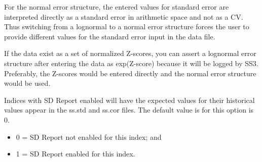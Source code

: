 For the normal error structure, the entered values for standard error are interpreted directly as a standard error in arithmetic space and not as a CV.  Thus switching from a lognormal to a normal error structure forces the user to provide different values for the standard error input in the data file.

If the data exist as a set of normalized Z-scores, you can assert a lognormal error structure after entering the data as exp(Z-score) because it will be logged by SS3.  Preferably, the Z-scores would be entered directly and the normal error structure would be used.

Indices with SD Report enabled will have the expected values for their historical values appear in the ss.std and ss.cor files. The default value is for this option is 0.
	\begin{itemize}
		\item 0 = SD Report not enabled for this index; and
		\item 1 = SD Report enabled for this index.
	\end{itemize}



